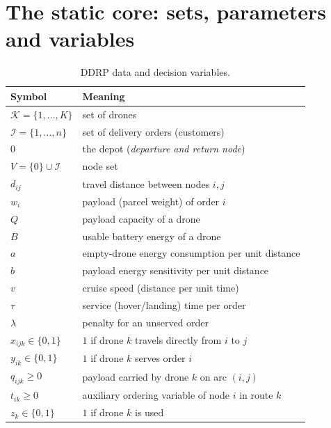 \documentclass[11pt,a4paper]{article}
\begin{document}
\section{The static core: sets, parameters and variables}

\begin{table}[H]
\centering
\caption{DDRP data and decision variables.}
\label{tab:ddrp}
\begin{tabular}{@{}ll@{}}
\toprule
Symbol & Meaning \\
\midrule
$\mathcal{K}=\{1,\dots,K\}$      & set of drones \\
$\mathcal{I}=\{1,\dots,n\}$      & set of delivery orders (customers) \\
$0$                              & the depot (\emph{departure and return node}) \\
$V=\{0\}\cup\mathcal{I}$         & node set \\
$d_{ij}$                         & travel distance between nodes $i,j$ \\
$w_{i}$                          & payload (parcel weight) of order $i$ \\
$Q$                              & payload capacity of a drone \\
$B$                              & usable battery energy of a drone \\
$a$                              & empty-drone energy consumption per unit distance \\
$b$                              & payload energy sensitivity per unit distance \\
$v$                              & cruise speed (distance per unit time) \\
$\tau$                           & service (hover/landing) time per order \\
$\lambda$                        & penalty for an unserved order \\
\addlinespace
$x_{ijk}\in\{0,1\}$              & $1$ if drone $k$ travels directly from $i$ to $j$ \\
$y_{ik}\in\{0,1\}$               & $1$ if drone $k$ serves order $i$ \\
$q_{ijk}\ge 0$                   & payload carried by drone $k$ on arc $(i,j)$ \\
$t_{ik}\ge 0$                    & auxiliary ordering variable of node $i$ in route $k$ \\
$z_{k}\in\{0,1\}$                & $1$ if drone $k$ is used \\
\bottomrule
\end{tabular}
\end{table}
\end{document}
